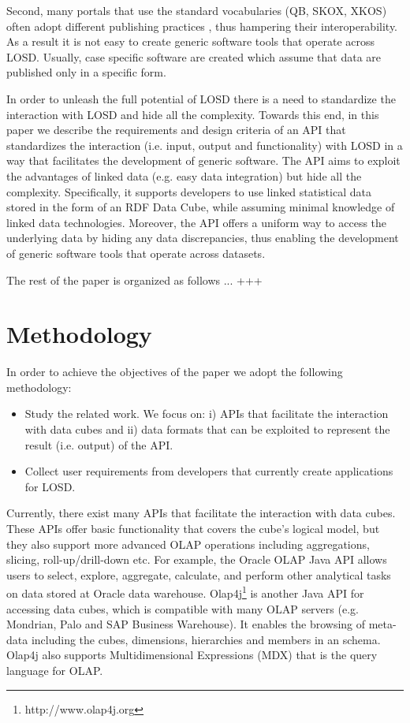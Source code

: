\documentclass{llncs}
\begin{document}
Second, many portals that use the standard vocabularies (QB, SKOX, XKOS) often adopt different publishing practices \cite{KalampokisChallenges}, thus hampering their interoperability. As a result it is not easy to create generic software tools that operate across LOSD. Usually, case specific software \cite{KaramanouResultsSoFar} are created which assume that data are published only in a specific form. 

In order to unleash the full potential of LOSD there is a need to standardize the interaction with LOSD and hide all the complexity. Towards this end, in this paper we describe the requirements and design criteria of an API that standardizes the interaction (i.e. input, output and functionality) with LOSD in a way that facilitates the development of generic software. The API aims to exploit the advantages of linked data (e.g. easy data integration) but hide all the complexity. Specifically, it supports developers to use linked statistical data stored in the form of an RDF Data Cube, while assuming minimal knowledge of linked data technologies. Moreover, the API offers a uniform way to access the underlying data by hiding any data discrepancies, thus enabling the development of generic software tools that operate across datasets. 

The rest of the paper is organized as follows ... +++

\section{Methodology}\label{sec:methodology}

In order to achieve the objectives of the paper we adopt the following methodology:
\begin{itemize}
\item Study the related work. We focus on: i) APIs that facilitate the interaction with data cubes and ii) data formats that can be exploited to represent the result (i.e. output) of the API. 
\item Collect user requirements from developers that currently create applications for LOSD. 
\end{itemize}

Currently, there exist many APIs that facilitate the interaction with data cubes. These APIs offer basic functionality that covers the cube's logical model, but they also support more advanced OLAP operations including aggregations, slicing, roll-up/drill-down etc. For example, the Oracle OLAP Java API \cite{ORACLEAPI} allows users to select, explore, aggregate, calculate, and perform other analytical tasks on data stored at Oracle data warehouse. Olap4j\footnote{http://www.olap4j.org} is another Java API for accessing data cubes, which is compatible with many OLAP servers (e.g. Mondrian, Palo and SAP Business Warehouse). It enables the browsing of meta-data including the cubes, dimensions, hierarchies and members in an schema. Olap4j also supports Multidimensional Expressions (MDX) that is the query language for OLAP.
\end{document}
